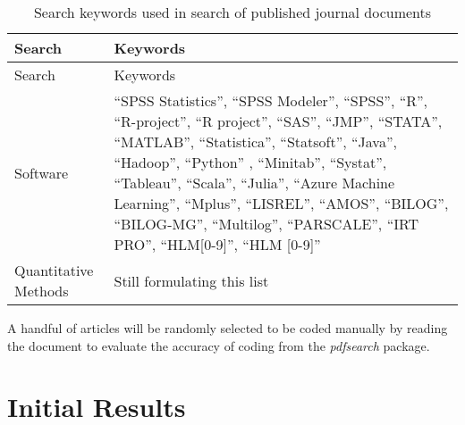 \documentclass[english,floatsintext,man]{apa6}
\theoremstyle{definition}
\theoremstyle{definition}
\theoremstyle{remark}
\begin{document}
\begin{longtable}[]{@{}ll@{}}
\caption{\label{tab:searchwords} Search keywords used in search of published
journal documents}\tabularnewline
\toprule
\begin{minipage}[b]{0.21\columnwidth}\raggedright\strut
Search\strut
\end{minipage} & \begin{minipage}[b]{0.38\columnwidth}\raggedright\strut
Keywords\strut
\end{minipage}\tabularnewline
\midrule
\endfirsthead
\toprule
\begin{minipage}[b]{0.21\columnwidth}\raggedright\strut
Search\strut
\end{minipage} & \begin{minipage}[b]{0.38\columnwidth}\raggedright\strut
Keywords\strut
\end{minipage}\tabularnewline
\midrule
\endhead
\begin{minipage}[t]{0.21\columnwidth}\raggedright\strut
Software\strut
\end{minipage} & \begin{minipage}[t]{0.38\columnwidth}\raggedright\strut
\enquote{SPSS Statistics}, \enquote{SPSS Modeler}, \enquote{SPSS},
\enquote{R}, \enquote{R-project}, \enquote{R project}, \enquote{SAS},
\enquote{JMP}, \enquote{STATA}, \enquote{MATLAB}, \enquote{Statistica},
\enquote{Statsoft}, \enquote{Java}, \enquote{Hadoop}, \enquote{Python} ,
\enquote{Minitab}, \enquote{Systat}, \enquote{Tableau}, \enquote{Scala},
\enquote{Julia}, \enquote{Azure Machine Learning}, \enquote{Mplus},
\enquote{LISREL}, \enquote{AMOS}, \enquote{BILOG}, \enquote{BILOG-MG},
\enquote{Multilog}, \enquote{PARSCALE}, \enquote{IRT PRO},
\enquote{HLM{[}0-9{]}}, \enquote{HLM {[}0-9{]}}\strut
\end{minipage}\tabularnewline
\begin{minipage}[t]{0.21\columnwidth}\raggedright\strut
Quantitative Methods\strut
\end{minipage} & \begin{minipage}[t]{0.38\columnwidth}\raggedright\strut
Still formulating this list\strut
\end{minipage}\tabularnewline
\bottomrule
\end{longtable}

A handful of articles will be randomly selected to be coded manually by
reading the document to evaluate the accuracy of coding from the
\emph{pdfsearch} package.

\section{Initial Results}\label{initial-results}
\end{document}
